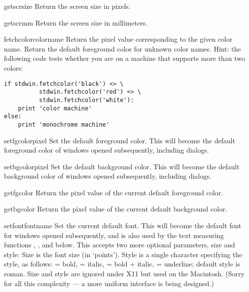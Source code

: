 \begin{funcdesc}{getscrsize}{}
Return the screen size in pixels.
\end{funcdesc}

\begin{funcdesc}{getscrmm}{}
Return the screen size in millimeters.
\end{funcdesc}

\begin{funcdesc}{fetchcolor}{colorname}
Return the pixel value corresponding to the given color name.
Return the default foreground color for unknown color names.
Hint: the following code tests whether you are on a machine that
supports more than two colors:
\bcode\begin{verbatim}
if stdwin.fetchcolor('black') <> \
          stdwin.fetchcolor('red') <> \
          stdwin.fetchcolor('white'):
    print 'color machine'
else:
    print 'monochrome machine'
\end{verbatim}\ecode
\end{funcdesc}

\begin{funcdesc}{setfgcolor}{pixel}
Set the default foreground color.
This will become the default foreground color of windows opened
subsequently, including dialogs.
\end{funcdesc}

\begin{funcdesc}{setbgcolor}{pixel}
Set the default background color.
This will become the default background color of windows opened
subsequently, including dialogs.
\end{funcdesc}

\begin{funcdesc}{getfgcolor}{}
Return the pixel value of the current default foreground color.
\end{funcdesc}

\begin{funcdesc}{getbgcolor}{}
Return the pixel value of the current default background color.
\end{funcdesc}

\begin{funcdesc}{setfont}{fontname}
Set the current default font.
This will become the default font for windows opened subsequently,
and is also used by the text measuring functions ,
\code{textbreak}, \code{lineheight} and \code{baseline} below.
This accepts two more optional parameters, size and style:
Size is the font size (in `points').
Style is a single character specifying the style, as follows:
\code{'b'} = bold,
\code{'i'} = italic,
 = bold + italic,
 = underline;
default style is roman.
Size and style are ignored under X11 but used on the Macintosh.
(Sorry for all this complexity --- a more uniform interface is being designed.)
\end{funcdesc}

